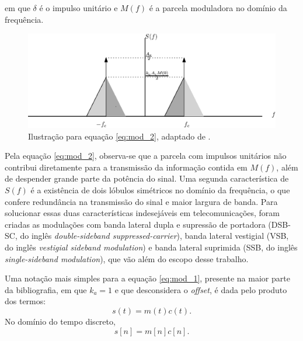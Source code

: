 em que $\delta$ é o impulso unitário e $M(f)$ é a parcela moduladora no domínio
da frequência.

\begin{figure}[H]
    \centering
    \includegraphics[scale=1]{chapters/chap01/images/mod.eps}
    \caption{Ilustração para equação \eqref{eq:mod_2}, adaptado de \cite{haykin2008}.}
\end{figure}

Pela equação \eqref{eq:mod_2}, observa-se que a parcela com impulsos unitários
não contribui diretamente para a transmissão da informação contida em $M(f)$,
além de despender grande parte da potência do sinal. Uma segunda característica
de $S(f)$ é a existência de dois lóbulos simétricos no domínio da
frequência, o que confere redundância na transmissão do sinal e maior largura de
banda. Para solucionar essas duas características indesejáveis em
telecomunicações, foram criadas as modulações com banda lateral dupla e
supressão de portadora (DSB-SC, do inglês \textit{double-sideband
suppressed-carrier}), banda lateral vestigial (VSB, do inglês \textit{vestigial
sideband modulation}) e banda lateral suprimida (SSB, do inglês
\textit{single-sideband modulation}), que vão além do escopo desse trabalho.


Uma notação mais simples para a equação \eqref{eq:mod_1}, presente na maior
parte da bibliografia, em que $k_a = 1$ e que desconsidera o \textit{offset}, é
dada pelo produto dos termos:
\begin{equation}
    s(t) = m(t)c(t). \label{eq:signal_eq}
\end{equation}
No domínio do tempo discreto,
\begin{equation}
    s[n] = m[n]c[n]. 
\end{equation}

